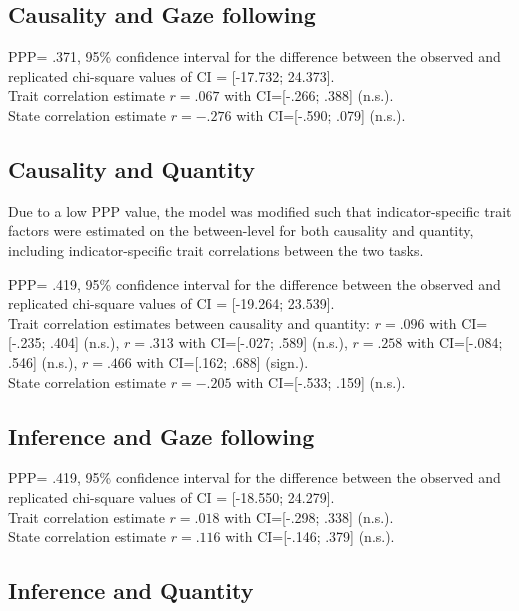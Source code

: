 \subsection{Causality and Gaze following}

PPP= .371, 95\% confidence interval for the difference between the observed and replicated chi-square values of CI = [-17.732; 24.373].\\
Trait correlation estimate $r=.067$ with CI=[-.266; .388] (n.s.).  \\
State correlation estimate $r= -.276$ with CI=[-.590; .079] (n.s.).\\

\subsection{Causality and Quantity}

Due to a low PPP value, the model was modified such that indicator-specific trait factors were estimated on the between-level for both causality and quantity, including indicator-specific trait correlations between the two tasks.

PPP= .419, 95\% confidence interval for the difference between the observed and replicated chi-square values of CI = [-19.264; 23.539].\\
Trait correlation estimates between causality and quantity: $r=.096$ with CI=[-.235; .404] (n.s.), $r=.313$ with CI=[-.027; .589] (n.s.), 
$r=.258$ with CI=[-.084; .546] (n.s.), $r=.466$ with CI=[.162; .688] (sign.). \\
State correlation estimate $r= -.205$ with CI=[-.533; .159] (n.s.).\\

\subsection{Inference and Gaze following}

PPP= .419, 95\% confidence interval for the difference between the observed and replicated chi-square values of CI = [-18.550; 24.279].\\
Trait correlation estimate $r=.018$ with CI=[-.298; .338] (n.s.).  \\
State correlation estimate $r= .116$ with CI=[-.146; .379] (n.s.).\\

\subsection{Inference and Quantity}

